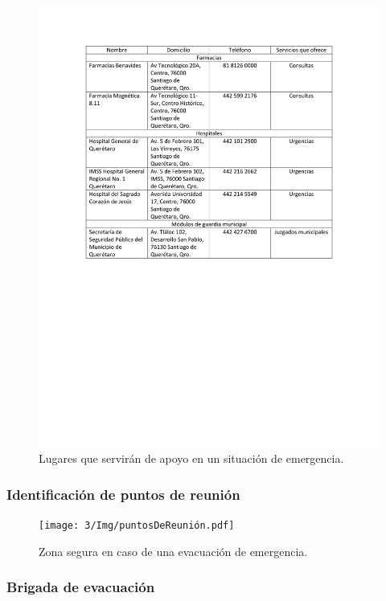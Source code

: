     \begin{figure}[H]
        \centering
        \includegraphics[trim = {20mm 95mm 20mm 20mm},clip,scale=0.5]{3/Img/apoyosExternos.pdf}
        \caption{ Lugares que servirán de apoyo en un situación de emergencia.}
        \label{fig:apoyosExternos}
    \end{figure}
    \subsubsection{Identificación de puntos de reunión}
    
    \begin{figure}[H]
        \centering
        \texttt{[image: 3/Img/puntosDeReunión.pdf]}
        \caption{Zona segura en caso de una evacuación de emergencia.}
        \label{fig:puntosDeReunión}
    \end{figure}
    \subsubsection{Brigada de evacuación}
    
